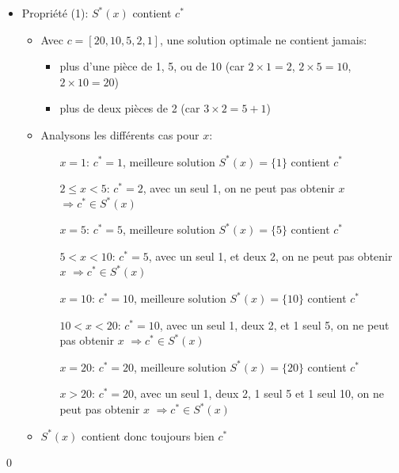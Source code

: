\begin{frame}
\begin{itemize}
\item Propriété (1): $S^*(x)$ contient $c^*$
\begin{itemize}
\item Avec $c=[20,10,5,2,1]$, une solution optimale ne contient jamais:
\begin{itemize}
\item plus d'une pièce de 1, 5, ou de 10 (car $2\times 1=2$, $2\times 5=10$, $2\times 10=20$)
\item plus de deux pièces de 2 (car $3\times 2=5+1$)
\end{itemize}
\item Analysons les différents cas pour $x$:
\begin{itemize}
\item[$x=1$:] $c^*=1$, meilleure solution $S^*(x)=\{1\}$ contient $c^*$
\item[$2\leq x<5$:] $c^*=2$, avec un seul 1, on ne peut pas obtenir $x$ $\Rightarrow c^*\in S^*(x)$
\item[$x=5$:] $c^*=5$, meilleure solution $S^*(x)=\{5\}$ contient $c^*$
\item[$5< x<10$:] $c^*=5$, avec un seul 1, et deux 2, on ne peut pas obtenir $x$ $\Rightarrow c^*\in S^*(x)$
\item[$x=10$:] $c^*=10$, meilleure solution $S^*(x)=\{10\}$ contient $c^*$
\item[$10<x<20$:] $c^*=10$, avec un seul 1, deux 2, et 1 seul 5, on ne peut pas obtenir $x$ $\Rightarrow c^*\in S^*(x)$
\item[$x=20$:] $c^*=20$, meilleure solution  $S^*(x)=\{20\}$ contient $c^*$
\item[$x>20$:] $c^*=20$, avec un seul 1, deux 2, 1 seul 5 et 1 seul 10, on ne peut pas obtenir $x$ $\Rightarrow c^*\in S^*(x)$
\end{itemize}
\item $S^*(x)$ contient donc toujours bien $c^*$
\end{itemize}
\end{itemize}\qed

\end{frame}

